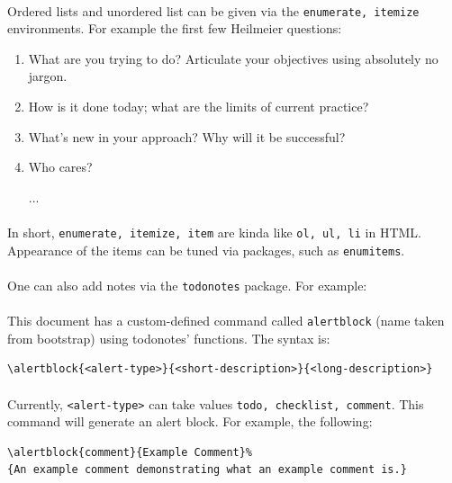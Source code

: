 \paragraph{}Ordered lists and unordered list can be given via the \texttt{enumerate, itemize} environments. For example the first few Heilmeier questions:
\begin{enumerate}[label=(\arabic*)]
    \item What are you trying to do? Articulate your objectives using absolutely no jargon.
    \item How is it done today; what are the limits of current practice?
    \item What's new in your approach? Why will it be successful?
    \item Who cares?
    \item[...]
\end{enumerate}
\paragraph{}In short, \texttt{enumerate, itemize, item} are kinda like \texttt{ol, ul, li} in HTML. Appearance of the items can be tuned via packages, such as \texttt{enumitems}.
\paragraph{}One can also add notes via the \texttt{todonotes} package. For example: 
\paragraph{}This document has a custom-defined command called \texttt{alertblock} (name taken from bootstrap) using todonotes' functions. The syntax is:
\begin{verbatim}
\alertblock{<alert-type>}{<short-description>}{<long-description>}
\end{verbatim}
\paragraph{}Currently, \texttt{<alert-type>} can take values \texttt{todo, checklist, comment}. This command will generate an alert block. For example, the following:
\begin{verbatim}
\alertblock{comment}{Example Comment}%
{An example comment demonstrating what an example comment is.}
\end{verbatim}

